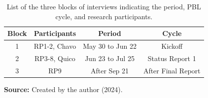 \begin{table}[htb]
\caption{List of the three blocks of interviews indicating the period, \acrshort{PBL} cycle, and research participants.}
\label{tbl:interview-dates}
\centering
{}
\begin{tabular}{
    m{3cm}|
    m{4cm}|
    m{4cm}|
    m{4cm}
}
    \hline
    \multicolumn{1}{c|}{
        \textbf{Block} 
    } &
    \multicolumn{1}{c|}{
    \textbf{Participants}
    } &
    \multicolumn{1}{c|}{
    \textbf{Period}
    } &
    \multicolumn{1}{c}{
    \textbf{Cycle}
    } \\
    
    \hline
    \multicolumn{1}{c|}{
        1
    } &
    \multicolumn{1}{c|}{
        RP1-2, Chavo
    } &
    \multicolumn{1}{c|}{
        May 30 to Jun 22
    } &
    \multicolumn{1}{c}{
        Kickoff
    } \\

    \multicolumn{1}{c|}{
        2
    } &
    \multicolumn{1}{c|}{
        RP3-8, Quico
    } &
    \multicolumn{1}{c|}{
        Jun 23 to Jul 25
    } &
    \multicolumn{1}{c}{
        Status Report 1
    } \\

    \multicolumn{1}{c|}{
        3
    } &
    \multicolumn{1}{c|}{
        RP9
    } &
    \multicolumn{1}{c|}{
        After Sep 21
    } &
    \multicolumn{1}{c}{
        After Final Report
    } \\
    \hline
    
\end{tabular}

\par\medskip\ABNTEXfontereduzida\selectfont\textbf{Source:} Created by the author (2024). \par\medskip

\end{table}

